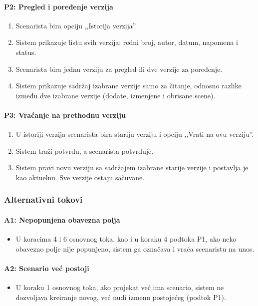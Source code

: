 \paragraph*{P2: Pregled i poređenje verzija}
\begin{enumerate}
    \item Scenarista bira opciju ,,Istorija verzija''.
    \item Sistem prikazuje listu svih verzija: redni broj, autor, datum, napomena i status.
    \item Scenarista bira jednu verziju za pregled ili dve verzije za poređenje.
    \item Sistem prikazuje sadržaj izabrane verzije samo za čitanje, odnosno razlike između dve izabrane verzije (dodate, izmenjene i obrisane scene).
\end{enumerate}

\paragraph*{P3: Vraćanje na prethodnu verziju}
\begin{enumerate}
    \item U istoriji verzija scenarista bira stariju verziju i opciju ,,Vrati na ovu verziju''.
    \item Sistem traži potvrdu, a scenarista potvrđuje.
    \item Sistem pravi novu verziju sa sadržajem izabrane starije verzije i postavlja je kao aktuelnu. Sve verzije ostaju sačuvane.
\end{enumerate}

\subsubsection*{Alternativni tokovi}

\paragraph*{A1: Nepopunjena obavezna polja}
\begin{itemize}
    \item U koracima 4 i 6 osnovnog toka, kao i u koraku 4 podtoka P1, ako neko obavezno polje nije popunjeno, sistem ga označava i vraća scenaristu na unos.
\end{itemize}

\paragraph*{A2: Scenario već postoji}
\begin{itemize}
    \item U koraku 1 osnovnog toka, ako projekat već ima scenario, sistem ne dozvoljava kreiranje novog, već nudi izmenu postojećeg (podtok P1).
\end{itemize}

